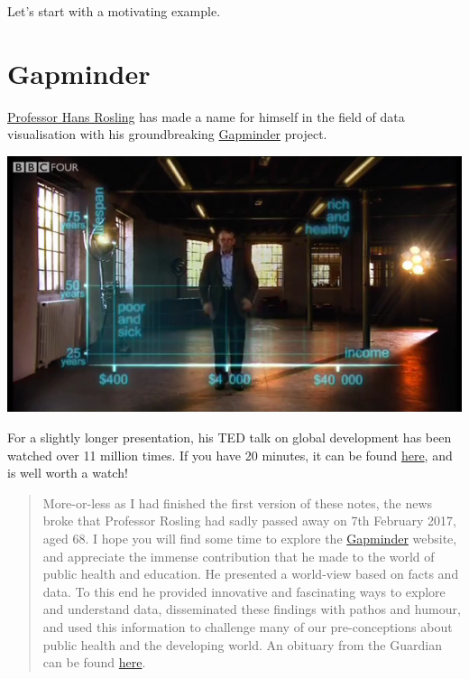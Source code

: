 \documentclass[]{book}
\theoremstyle{definition}
\theoremstyle{definition}
\theoremstyle{definition}
\theoremstyle{remark}
\begin{document}
Let's start with a motivating example.

\section{Gapminder}\label{gapminder}

\href{https://en.wikipedia.org/wiki/Hans_Rosling}{Professor Hans
Rosling} has made a name for himself in the field of data visualisation
with his groundbreaking \href{https://www.gapminder.org/}{Gapminder}
project.

\begin{center}\includegraphics{images/hans} \end{center}

For a slightly longer presentation, his TED talk on global development
has been watched over 11 million times. If you have 20 minutes, it can
be found
\href{https://www.ted.com/talks/hans_rosling_shows_the_best_stats_you_ve_ever_seen?utm_source=tedcomshare\&utm_medium=referral\&utm_campaign=tedspread}{here},
and is well worth a watch!

\begin{quote}
More-or-less as I had finished the first version of these notes, the
news broke that Professor Rosling had sadly passed away on 7th February
2017, aged 68. I hope you will find some time to explore the
\href{https://www.gapminder.org/}{Gapminder} website, and appreciate the
immense contribution that he made to the world of public health and
education. He presented a world-view based on facts and data. To this
end he provided innovative and fascinating ways to explore and
understand data, disseminated these findings with pathos and humour, and
used this information to challenge many of our pre-conceptions about
public health and the developing world. An obituary from the Guardian
can be found
\href{https://www.theguardian.com/global-development/2017/feb/07/hans-rosling-obituary}{here}.
\end{quote}
\end{document}
